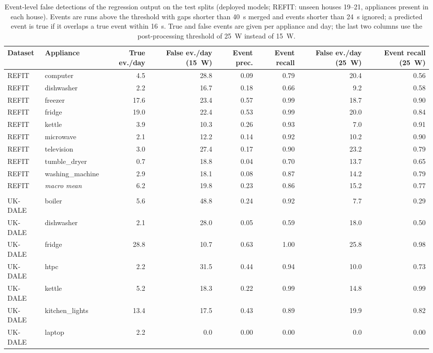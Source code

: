 \begin{table}[H]
\centering
\caption{Event-level false detections of the regression output on the test splits (deployed models; REFIT: unseen houses 19--21, appliances present in each house). Events are runs above the threshold with gaps shorter than 40~s merged and events shorter than 24~s ignored; a predicted event is true if it overlaps a true event within 16~s. True and false events are given per appliance and day; the last two columns use the post-processing threshold of 25~W instead of 15~W.}
\label{tab:event_false_alarms}
\scriptsize
\begin{tabular}{@{}llrrrrrr@{}}
\toprule
Dataset & Appliance & True ev./day & False ev./day (15~W) & Event prec. & Event recall & False ev./day (25~W) & Event recall (25~W) \\
\midrule
REFIT & computer & 4.5 & 28.8 & 0.09 & 0.79 & 20.4 & 0.56 \\
REFIT & dishwasher & 2.2 & 16.7 & 0.18 & 0.66 & 9.2 & 0.58 \\
REFIT & freezer & 17.6 & 23.4 & 0.57 & 0.99 & 18.7 & 0.90 \\
REFIT & fridge & 19.0 & 22.4 & 0.53 & 0.99 & 20.0 & 0.84 \\
REFIT & kettle & 3.9 & 10.3 & 0.26 & 0.93 & 7.0 & 0.91 \\
REFIT & microwave & 2.1 & 12.2 & 0.14 & 0.92 & 10.2 & 0.90 \\
REFIT & television & 3.0 & 27.4 & 0.17 & 0.90 & 23.2 & 0.79 \\
REFIT & tumble\_dryer & 0.7 & 18.8 & 0.04 & 0.70 & 13.7 & 0.65 \\
REFIT & washing\_machine & 2.9 & 18.1 & 0.08 & 0.87 & 14.2 & 0.79 \\
REFIT & \textit{macro mean} & 6.2 & 19.8 & 0.23 & 0.86 & 15.2 & 0.77 \\
\midrule \\
UK-DALE & boiler & 5.6 & 48.8 & 0.24 & 0.92 & 7.7 & 0.29 \\
UK-DALE & dishwasher & 2.1 & 28.0 & 0.05 & 0.59 & 18.0 & 0.50 \\
UK-DALE & fridge & 28.8 & 10.7 & 0.63 & 1.00 & 25.8 & 0.98 \\
UK-DALE & htpc & 2.2 & 31.5 & 0.44 & 0.94 & 10.0 & 0.73 \\
UK-DALE & kettle & 5.2 & 18.3 & 0.22 & 0.99 & 14.8 & 0.99 \\
UK-DALE & kitchen\_lights & 13.4 & 17.5 & 0.43 & 0.89 & 19.9 & 0.82 \\
UK-DALE & laptop & 2.2 & 0.0 & 0.00 & 0.00 & 0.0 & 0.00 \\

\end{tabular}
\end{table}
